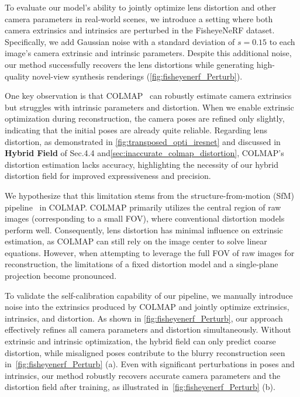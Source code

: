 To evaluate our model's ability to jointly optimize lens distortion and other camera parameters in real-world scenes, we introduce a setting where both camera extrinsics and intrinsics are perturbed in the FisheyeNeRF dataset. 
Specifically, we add Gaussian noise with a standard deviation of $s=0.15$ to each image's camera extrinsic and intrinsic parameters.
Despite this additional noise, our method successfully recovers the lens distortions while generating high-quality novel-view synthesis renderings (\cref{fig:fisheyenerf_Perturb}).

One key observation is that COLMAP~\cite{schoenberger2016sfm} can robustly estimate camera extrinsics but struggles with intrinsic parameters and distortion. When we enable extrinsic optimization during reconstruction, the camera poses are refined only slightly, indicating that the initial poses are already quite reliable. Regarding lens distortion, as demonstrated in \cref{fig:transposed_opti_iresnet} and discussed in \textbf{Hybrid Field} of Sec.4.4 and\cref{sec:inaccurate_colmap_distortion}, COLMAP's distortion estimation lacks accuracy, highlighting the necessity of our hybrid distortion field for improved expressiveness and precision.


We hypothesize that this limitation stems from the structure-from-motion (SfM) pipeline~\cite{schoenberger2016sfm} in COLMAP. COLMAP primarily utilizes the central region of raw images (corresponding to a small FOV), where conventional distortion models perform well. Consequently, lens distortion has minimal influence on extrinsic estimation, as COLMAP can still rely on the image center to solve linear equations. However, when attempting to leverage the full FOV of raw images for reconstruction, the limitations of a fixed distortion model and a single-plane projection become pronounced. 

To validate the self-calibration capability of our pipeline, we manually introduce noise into the extrinsics produced by COLMAP and jointly optimize extrinsics, intrinsics, and distortion. As shown in \cref{fig:fisheyenerf_Perturb}, our approach effectively refines all camera parameters and distortion simultaneously. Without extrinsic and intrinsic optimization, the hybrid field can only predict coarse distortion, while misaligned poses contribute to the blurry reconstruction seen in~\cref{fig:fisheyenerf_Perturb} (a). Even with significant perturbations in poses and intrinsics, our method robustly recovers accurate camera parameters and the distortion field after training, as illustrated in~\cref{fig:fisheyenerf_Perturb} (b).



